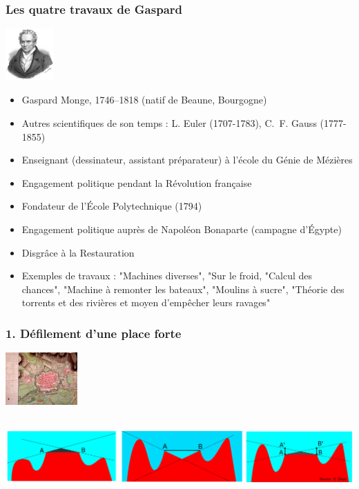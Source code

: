 \documentclass[9pt]{beamer}
\begin{document}
\begin{frame}
\frametitle{\bf Les quatre travaux de Gaspard}

\centering \includegraphics[height=2.0cm]{monge}

\begin{itemize}
  \item Gaspard Monge, 1746--1818 (natif de Beaune, Bourgogne)
  \item Autres scientifiques de son temps : L. Euler (1707-1783), C.~F. Gauss (1777-1855)
  \item Enseignant (dessinateur, assistant pr\'eparateur) \`a l'\'ecole du G\'enie de M\'ezi\`eres
  \item Engagement politique pendant la R\'evolution fran\c caise
  \item Fondateur de l'\'Ecole Polytechnique (1794)
  \item Engagement politique aupr\`es de Napol\'eon Bonaparte (campagne d'\'Egypte)
  \item Disgr\^ace \`a la Restauration
  \item Exemples de travaux : "Machines diverses", "Sur le froid, "Calcul des chances", "Machine \`a remonter les bateaux", "Moulins \`a sucre", "Th\'eorie des torrents et des rivi\`eres et moyen d'emp\^echer leurs ravages"
\end{itemize}
 
\end{frame}

\begin{frame}
\frametitle{\bf 1. D\'efilement d'une place forte}
 
\centering \includegraphics[height=2.0cm]{defil1}

\centering \includegraphics[height=3.0cm]{defil2}

\end{frame}
\end{document}
